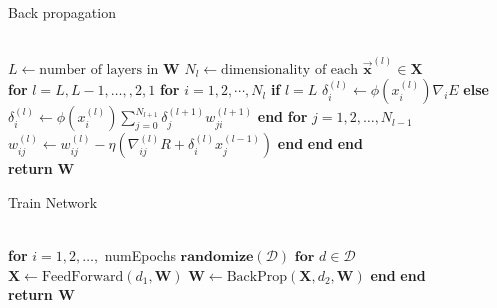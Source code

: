 \documentclass[prl,amsmath,amssymb,floatfix,superscriptaddress,notitlepage,twocolumn]{revtex4}
\newcommand{\vc}[1]{\vec{\mathbf{#1}}} 								%
\begin{document}
\begin{algorithm}[H]
\caption{Back propagation}\label{back_prop}
\begin{algorithmic}[]
\Procedure{BackProp}{\textbf{X}, $\vc y$, \textbf{W}}\\
\State $L \gets \text{number of layers in }\textbf{W}$
\State $N_l \gets \text{dimensionality of each } \vc x^{(l)} \in \textbf{X}$\\

\State \textbf{for} $l=L,L-1,\dots,,2,1$
\State \hspace{.25cm}\textbf{for} $i = 1,2,\cdots, N_l$
\State \hspace{.50cm}\textbf{if} $l=L$
\State \hspace{.75cm} $\delta^{(l)}_i \gets \phi(x_i^{(l)})\nabla_i E$
\State \hspace{.50cm}\textbf{else}
\State \hspace{.75cm} $\delta^{(l)}_i\gets \phi(x^{(l)}_i)\sum_{j=0}^{N_{l+1}}\delta^{(l+1)}_jw^{(l+1)}_{ji}$
\State \hspace{.50cm}\textbf{end}
\State \hspace{.50cm}\textbf{for} $j=1,2,\dots,N_{l-1}$
\State \hspace{.75cm}$w^{(l)}_{ij}\gets w^{(l)}_{ij}-\eta\left(\nabla^{(l)}_{ij}R+\delta^{(l)}_ix^{(l-1)}_j\right)$
\State \hspace{.50cm}\textbf{end}
\State \hspace{.25cm}\textbf{end}
\State \textbf{end}\\

\State \textbf{return} \textbf{W}\\
\EndProcedure
\end{algorithmic}
\end{algorithm}

\begin{algorithm}[H]
\caption{Train Network}\label{train_ANN}
\begin{algorithmic}[]
\\

\State \textbf{for} $i = 1, 2, \dots,$ numEpochs
\State \hspace{.25cm} $\textbf{randomize}(\mathcal{D})$ 
\State \hspace{.25cm} $\textbf{for } d\in\mathcal{D}$
\State \hspace{.50cm} $\textbf{X} \gets \text{FeedForward}(d_1,\textbf{W})$
\State \hspace{.50cm} $\textbf{W} \gets \text{BackProp}(\textbf{X}, d_2,\textbf{W})$
\State \hspace{.25cm} \textbf{end}
\State \textbf{end}\\

\State \textbf{return W}\\

\EndProcedure
\end{algorithmic}
\end{algorithm}
\end{document}
